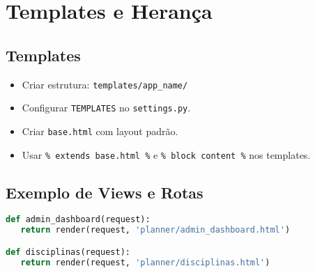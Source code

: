 \chapter{Templates e Heran\c{c}a}
\section{Templates}
\begin{itemize}
  \item Criar estrutura: \texttt{templates/app\_name/}
  \item Configurar \texttt{TEMPLATES} no \texttt{settings.py}.
  \item Criar \texttt{base.html} com layout padr\~ao.
  \item Usar \texttt{{\% extends \textquotedbl{}base.html\textquotedbl{} \%}} e \texttt{{\% block content \%}} nos templates.
\end{itemize}

\section{Exemplo de Views e Rotas}
\begin{lstlisting}[language=Python]
def admin_dashboard(request):
   return render(request, 'planner/admin_dashboard.html')

def disciplinas(request):
   return render(request, 'planner/disciplinas.html')
\end{lstlisting}
